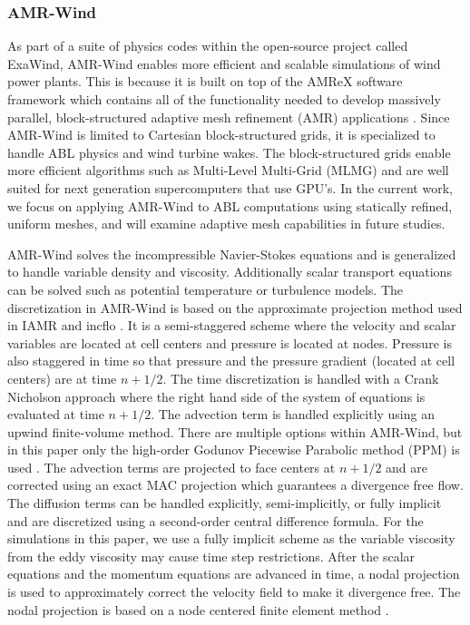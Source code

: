 \subsubsection{AMR-Wind}

As part of a suite of physics codes within the open-source project called ExaWind,
AMR-Wind enables more efficient and scalable simulations of wind power plants.
This is because it is built on top of the AMReX software framework which contains
all of the functionality needed to develop massively parallel, block-structured
adaptive mesh refinement (AMR) applications \cite{AMReX_JOSS}.
Since AMR-Wind is limited to Cartesian block-structured grids, it is specialized
to handle ABL physics and wind turbine wakes.
The block-structured grids enable more efficient algorithms such as
Multi-Level Multi-Grid (MLMG) \cite{AMReX_JOSS}
and are well suited for next generation supercomputers that use GPU's.
In the current work, we focus on applying AMR-Wind to ABL computations
using statically refined, uniform meshes, and will examine adaptive
mesh capabilities in future studies.

AMR-Wind solves the incompressible Navier-Stokes equations and is generalized to
handle variable density and viscosity. Additionally scalar transport equations can be
solved such as potential temperature or turbulence models. The discretization in AMR-Wind
is based on the approximate projection method used in IAMR \cite{almgren1998conservative}
and incflo \cite{sverdrup2018highly}. It is a semi-staggered scheme where the velocity and scalar
variables are located at cell centers and pressure is located at nodes. Pressure is also staggered
in time so that pressure and the pressure gradient (located at cell centers) are at time $n+1/2$.
The time discretization is handled with a Crank Nicholson approach where the right hand side
of the system of equations is evaluated at time $n+1/2$. The advection term is handled explicitly
using an upwind finite-volume method. There are multiple options
within AMR-Wind, but in this paper only the high-order Godunov Piecewise Parabolic
method (PPM) is used \cite{Colella1984}. The advection terms are projected to face
centers at $n+1/2$ and are corrected using an exact MAC projection \cite{almgren1998conservative}
which guarantees a divergence free flow. The diffusion terms can be handled explicitly, semi-implicitly,
or fully implicit and are discretized using a second-order central difference formula.
For the simulations in this paper, we use a fully implicit scheme as the variable viscosity
from the eddy viscosity may cause time step restrictions. After the scalar equations
and the momentum equations are advanced in time, a nodal projection is used to
approximately correct the velocity field to make it divergence free.  The nodal projection
is based on a node centered finite element method \cite{almgren1998conservative}.

